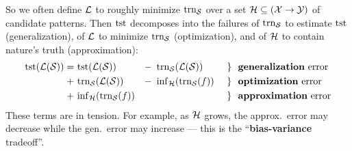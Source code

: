 
        So
        we often define
        $\mathcal{L}$ to roughly
        minimize $\text{trn}_{\mathcal{S}}$ over a
        set $\mathcal{H} \subseteq (\mathcal{X}\to \mathcal{Y})$ of candidate patterns.  Then $\text{tst}$
        decomposes
        into the failures
        of
        $\text{trn}_{\mathcal{S}}$ to estimate $\text{tst}$ (generalization),
        of
        $\mathcal{L}$ to minimize $\text{trn}_{\mathcal{S}}$ (optimization), and
        of
        $\mathcal{H}$ to contain
        nature's
        truth (approximation):
        \newcommand{\minf}[1]{{\inf}_{\hH}}
        \begin{align*}
            \Eout(\lL(\sS))
            =~&\Eout(\lL(\sS))      &-\,\,\,&      \Ein(\lL(\sS)) &~\}~~& \text{\textbf{generalization} error} \\
            +~&\Ein(\lL(\sS))       &-\,\,\,& \minf{\hH}(\Ein(f)) &~\}~~& \text{\textbf{optimization} error} \\
            +~&\minf{\hH}(\Ein(f))  &       &                     &~\}~~& \text{\textbf{approximation} error}
        \end{align*}
        These terms are in tension.  For example, as $\mathcal{H}$ grows, the
        approx.\ error may decrease while the gen.\ error may
        increase --- this is the ``\textbf{bias-variance} tradeoff''.



